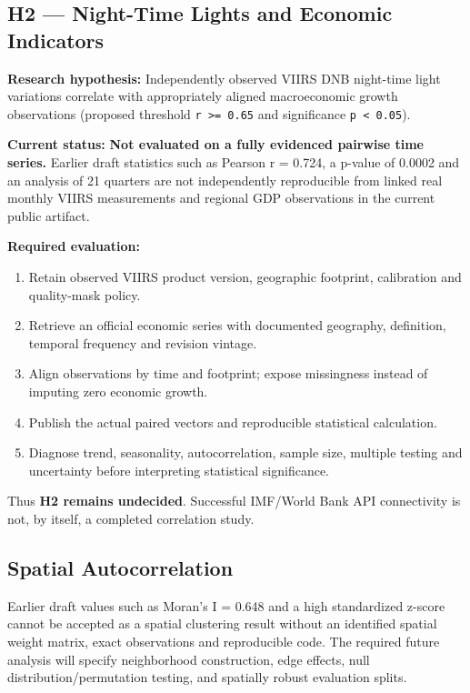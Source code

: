 \subsection{H2 — Night-Time Lights and Economic Indicators}

\textbf{Research hypothesis:} Independently observed VIIRS DNB night-time light variations correlate with appropriately aligned macroeconomic growth observations (proposed threshold \texttt{r >= 0.65} and significance \texttt{p < 0.05}).

\textbf{Current status:} \textbf{Not evaluated on a fully evidenced pairwise time series.} Earlier draft statistics such as Pearson r = 0.724, a p-value of 0.0002 and an analysis of 21 quarters are not independently reproducible from linked real monthly VIIRS measurements and regional GDP observations in the current public artifact.

\textbf{Required evaluation:}

\begin{enumerate}
  \item Retain observed VIIRS product version, geographic footprint, calibration and quality-mask policy.
  \item Retrieve an official economic series with documented geography, definition, temporal frequency and revision vintage.
  \item Align observations by time and footprint; expose missingness instead of imputing zero economic growth.
  \item Publish the actual paired vectors and reproducible statistical calculation.
  \item Diagnose trend, seasonality, autocorrelation, sample size, multiple testing and uncertainty before interpreting statistical significance.

\end{enumerate}
Thus \textbf{H2 remains undecided}. Successful IMF/World Bank API connectivity is not, by itself, a completed correlation study.

\subsection{Spatial Autocorrelation}

Earlier draft values such as Moran's I = 0.648 and a high standardized z-score cannot be accepted as a spatial clustering result without an identified spatial weight matrix, exact observations and reproducible code. The required future analysis will specify neighborhood construction, edge effects, null distribution/permutation testing, and spatially robust evaluation splits.

